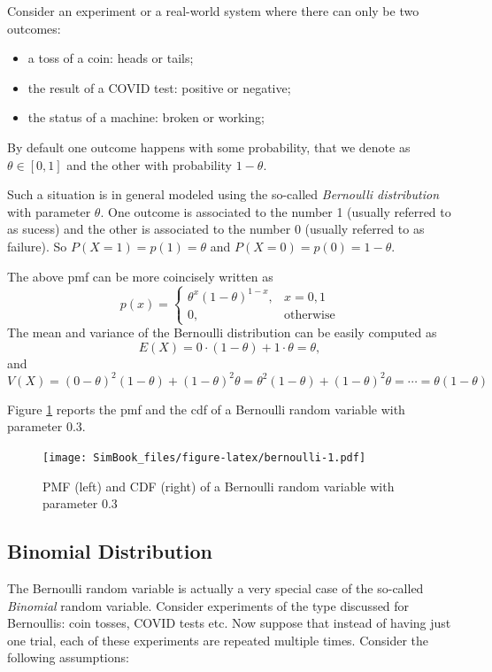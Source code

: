 \documentclass[
]{book}
\begin{document}
Consider an experiment or a real-world system where there can only be two outcomes:

\begin{itemize}
\item
  a toss of a coin: heads or tails;
\item
  the result of a COVID test: positive or negative;
\item
  the status of a machine: broken or working;
\end{itemize}

By default one outcome happens with some probability, that we denote as \(\theta\in [0,1]\) and the other with probability \(1-\theta\).

Such a situation is in general modeled using the so-called \emph{Bernoulli distribution} with parameter \(\theta\). One outcome is associated to the number 1 (usually referred to as sucess) and the other is associated to the number 0 (usually referred to as failure). So \(P(X=1)=p(1)=\theta\) and \(P(X=0)=p(0)=1-\theta\).

The above pmf can be more coincisely written as
\[
p(x)=\left\{
\begin{array}{ll}
\theta^x(1-\theta)^{1-x}, & x=0,1\\
0, & \mbox{otherwise}
\end{array}
\right.
\]
The mean and variance of the Bernoulli distribution can be easily computed as
\[
E(X)=0\cdot(1-\theta)+ 1\cdot\theta=\theta,
\]
and
\[
V(X)=(0-\theta)^2(1-\theta)+(1-\theta)^2\theta=\theta^2(1-\theta)+(1-\theta)^2\theta=\cdots = \theta(1-\theta)
\]

Figure \ref{fig:bernoulli} reports the pmf and the cdf of a Bernoulli random variable with parameter 0.3.

\begin{figure}
\centering
\texttt{[image: SimBook\_files/figure-latex/bernoulli-1.pdf]}
\caption{\label{fig:bernoulli}PMF (left) and CDF (right) of a Bernoulli random variable with parameter 0.3}
\end{figure}

\hypertarget{binomial-distribution}{%
\subsection{Binomial Distribution}\label{binomial-distribution}}

The Bernoulli random variable is actually a very special case of the so-called \emph{Binomial} random variable. Consider experiments of the type discussed for Bernoullis: coin tosses, COVID tests etc. Now suppose that instead of having just one trial, each of these experiments are repeated multiple times. Consider the following assumptions:
\end{document}
